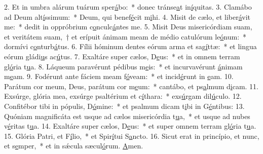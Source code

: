 2. Et in umbra alárum tuárum sper\uline{á}bo:~* donec tránse\uline{a}t in\uline{í}quitas.
3. Clamábo ad Deum alt\uline{í}ssimum:~* Deum, qui benef\uline{é}cit m\uline{i}hi.
4. Misit de cælo, et liber\uline{á}vit me:~* dedit in oppróbrium c\uline{o}nculc\uline{á}ntes me.
5. Misit Deus misericórdiam suam, et veritátem suam,~† et erípuit ánimam meam de médio catulórum le\uline{ó}num:~* dormívi c\uline{o}nturb\uline{á}tus.
6. Fílii hóminum dentes eórum arma et sag\uline{í}ttæ:~* et lingua eórum gládi\uline{u}s ac\uline{ú}tus.
7. Exaltáre super cælos, D\uline{e}us:~* et in omnem terram gl\uline{ó}ria t\uline{u}a.
8. Láqueum paravérunt pédibus m\uline{e}is:~* et incurvavérunt \uline{á}nimam m\uline{e}am.
9. Fodérunt ante fáciem meam f\uline{ó}veam:~* et incid\uline{é}runt in \uline{e}am.
10. Parátum cor meum, Deus, parátum cor m\uline{e}um:~* cantábo, et ps\uline{a}lmum d\uline{i}cam.
11. Exsúrge, glória mea, exsúrge psaltérium et c\uline{í}thara:~* exs\uline{ú}rgam dil\uline{ú}culo.
12. Confitébor tibi in pópulis, D\uline{ó}mine:~* et psalmum dicam t\uline{i}bi in G\uline{é}ntibus:
13. Quóniam magnificáta est usque ad cælos misericórdia t\uline{u}a,~* et usque ad nubes v\uline{é}ritas t\uline{u}a.
14. Exaltáre super cælos, D\uline{e}us:~* et super omnem terram gl\uline{ó}ria t\uline{u}a.
15. Glória Patri, et F\uline{í}lio,~* et Spir\uline{í}tui S\uline{a}ncto.
16. Sicut erat in princípio, et nunc, et s\uline{e}mper,~* et in sǽcula sæcul\uline{ó}rum. \uline{A}men.
